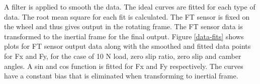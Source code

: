 \documentclass{article}
\begin{document}
A filter is applied to smooth the data. The ideal curves are fitted for each type of data. The root mean square for each fit is calculated. The FT sensor is fixed on the wheel and thus gives output in the rotating frame. The FT sensor data is transformed to the inertial frame for the final output. Figure \ref{data-fits} shows plots for FT sensor output data along with the smoothed and fitted data points for Fx and Fy, for the case of 10 N load, zero slip ratio, zero slip and camber angles. A sin and cos function is fitted for Fx and Fy respectively. The curves have a constant bias that is eliminated when transforming to inertial frame.  

\begin{figure}[hbt!]
    \centering
    \begin{minipage}{0.45\textwidth}
        \centering
    \end{minipage}
    \begin{minipage}{0.45\textwidth}
        \centering

\end{minipage}
\end{figure}
\end{document}
